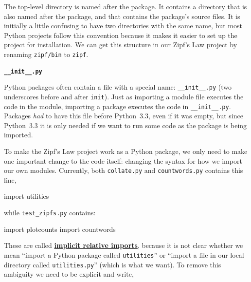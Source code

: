 \documentclass[
]{krantz}
\makeatletter
\newenvironment{Shaded}{\begin{snugshade}}{\end{snugshade}}
\newcommand{\ImportTok}[1]{#1}
\newcommand{\NormalTok}[1]{#1}
\renewenvironment{quote}{\begin{VF}}{\end{VF}}
\newenvironment{kframe}{%
\medskip{}
\setlength{\fboxsep}{.8em}
 \def\at@end@of@kframe{}%
 \ifinner\ifhmode%
  \def\at@end@of@kframe{\end{minipage}}%
  \begin{minipage}{\columnwidth}%
 \fi\fi%
 \def\FrameCommand##1{\hskip\@totalleftmargin \hskip-\fboxsep
 \colorbox{shadecolor}{##1}\hskip-\fboxsep
     \hskip-\linewidth \hskip-\@totalleftmargin \hskip\columnwidth}%
 \MakeFramed {\advance\hsize-\width
   \@totalleftmargin\z@ \linewidth\hsize
   \@setminipage}}%
 {\par\unskip\endMakeFramed%
 \at@end@of@kframe}
\renewenvironment{Shaded}{\begin{kframe}}{\end{kframe}}
\newcommand{\gref}[2]{\hyperlink{#2}{\textbf{#1}}}
\makeatother
\begin{document}
The top-level directory is named after the package.
It contains a directory that is also named after the package,
and that contains the package's source files.
It is initially a little confusing to have two directories with the same name,
but most Python projects follow this convention because
it makes it easier to set up the project for installation.
We can get this structure in our Zipf's Law project
by renaming \texttt{zipf/bin} to \texttt{zipf}.

\begin{quote}
\textbf{\texttt{\_\_init\_\_.py}}

Python packages often contain a file with a special name:
\texttt{\_\_init\_\_.py}
(two underscores before and after \texttt{init}).
Just as importing a module file executes the code in the module,
importing a package executes the code in \texttt{\_\_init\_\_.py}.
Packages \emph{had} to have this file before Python~3.3,
even if it was empty,
but since Python~3.3 it is only needed
if we want to run some code as the package is being imported.
\end{quote}

To make the Zipf's Law project work as a Python package,
we only need to make one important change to the code itself:
changing the syntax for how we import our own modules.
Currently,
both \texttt{collate.py} and \texttt{countwords.py} contains this line,

\begin{Shaded}
\begin{Highlighting}[]
\ImportTok{import}\NormalTok{ utilities}
\end{Highlighting}
\end{Shaded}

while \texttt{test\_zipfs.py} contains:

\begin{Shaded}
\begin{Highlighting}[]
\ImportTok{import}\NormalTok{ plotcounts}
\ImportTok{import}\NormalTok{ countwords}
\end{Highlighting}
\end{Shaded}

These are called
\gref{implicit relative imports}{implicit\_relative\_import},
because it is not clear whether we mean
``import a Python package called \texttt{utilities}''
or
``import a file in our local directory called \texttt{utilities.py}''
(which is what we want).
To remove this ambiguity we need to be explicit and write,
\end{document}
